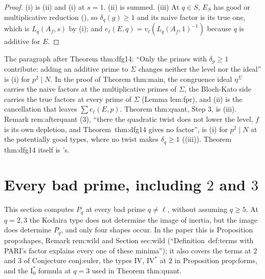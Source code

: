 \begin{proof}
(i) is (ii) and (i) at $s=1$. (ii) is  summed. (iii) At $q\in S$, $E_S$ has good or multiplicative
reduction (), so $\delta_q(g)\ge1$ and its naive factor is its true one, which is $L_q(A_f,s)$ by (i); and $e_\ell(E,q)=v_\ell(L_q(A_f,1)^{-1})$
because $q$ is additive for $E$.
\end{proof}

\begin{paperlink}
The paragraph after Theorem thm:dfg14: ``Only the primes with $\delta_p\ge1$ contribute: adding an additive prime to $\Sigma$ changes neither the level nor the ideal'' is (i) for
$p^2\mid N$. In the proof of Theorem thm:main, the congruence ideal $\eta^\Sigma$ carries the naive factors at the multiplicative primes of $\Sigma$, the Bloch-Kato side carries the
true factors at every prime of $\Sigma$ (Lemma lem:fpr), and (ii) is the cancellation that leaves $\sum e_\ell(E,p)$. Theorem thm:quant, Step 3, is (iii). Remark rem:afterquant (3),
``there the quadratic twist does not lower the level, $f$ is its own depletion, and Theorem~thm:dfg14 gives no factor'', is (i) for $p^2\mid N$ at the potentially good types,
where no twist makes $\delta_q\ge1$ ((iii)). Theorem thm:dfg14 itself is 's.
\end{paperlink}

\section{Every bad prime, including \texorpdfstring{$2$}{2} and \texorpdfstring{$3$}{3}}\label{sec:lfunctions:all-primes}

This section computes $P_q$ at every bad prime $q\ne\ell$, without assuming $q\ge5$. At $q=2,3$ the Kodaira type does not determine the image of inertia, but the
image does determine $P_q$, and only four shapes occur. In the paper this is Proposition prop:shapes, Remark rem:wild and Section sec:wild (``Definition~def:terms with
PARI's factor explains every one of these minima''); it also covers the terms at $2$ and $3$ of Conjecture conj:euler, the types $\mathrm{IV}$, $\mathrm{IV}^*$ at $2$ in Proposition
prop:forms, and the $\mathrm I_0^*$ formula at $q=3$ used in Theorem thm:quant.

